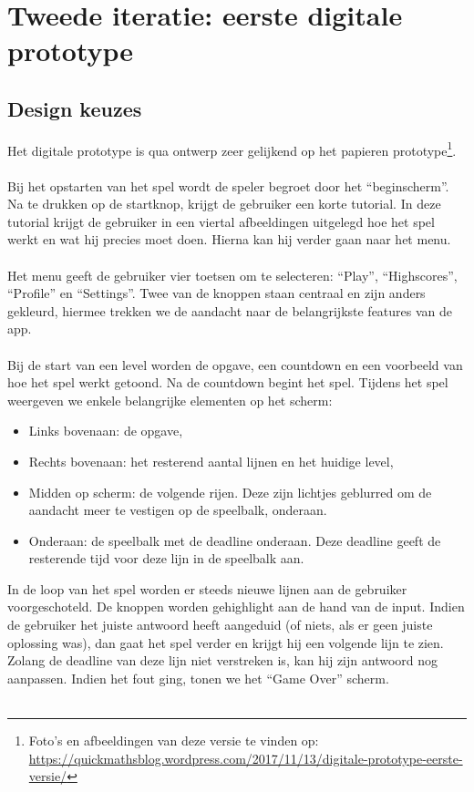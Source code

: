 \documentclass[11pt]{article}
\begin{document}
\newpage
\section{Tweede iteratie: eerste digitale prototype}\label{tweede:iteratie}
	\subsection{Design keuzes}
Het digitale prototype is qua ontwerp zeer gelijkend op het papieren prototype\footnote{Foto's en afbeeldingen van deze versie te vinden op: \url{https://quickmathsblog.wordpress.com/2017/11/13/digitale-prototype-eerste-versie/}}.\\\\
Bij het opstarten van het spel wordt de speler begroet door het ``beginscherm''. Na te drukken op de startknop, krijgt de gebruiker een korte tutorial. In deze tutorial krijgt de gebruiker in een viertal afbeeldingen uitgelegd hoe het spel werkt en wat hij precies moet doen. Hierna kan hij verder gaan naar het menu.\\\\
Het menu geeft de gebruiker vier toetsen om te selecteren: ``Play'', ``Highscores'', ``Profile'' en ``Settings''.
Twee van de knoppen staan centraal en zijn anders gekleurd, hiermee trekken we de aandacht naar de belangrijkste features van de app.\\\\
Bij de start van een level worden de opgave, een countdown en een voorbeeld van hoe het spel werkt getoond. Na de countdown begint het spel. Tijdens het spel weergeven we enkele belangrijke elementen op het scherm:
\begin{itemize}
	\item Links bovenaan: de opgave,
	\item Rechts bovenaan: het resterend aantal lijnen en het huidige level,
	\item Midden op scherm: de volgende rijen. Deze zijn lichtjes geblurred om de aandacht meer te vestigen op de speelbalk, onderaan.
	\item Onderaan: de speelbalk met de deadline onderaan. Deze deadline geeft de resterende tijd voor deze lijn in de speelbalk aan.
\end{itemize}
In de loop van het spel worden er steeds nieuwe lijnen aan de gebruiker voorgeschoteld. De knoppen worden gehighlight aan de hand van de input. Indien de gebruiker het juiste antwoord heeft aangeduid (of niets, als er geen juiste oplossing was), dan gaat het spel verder en krijgt hij een volgende lijn te zien. Zolang de deadline van deze lijn niet verstreken is, kan hij zijn antwoord nog aanpassen. Indien het fout ging, tonen we het ``Game Over'' scherm.\\\\
\end{document}

